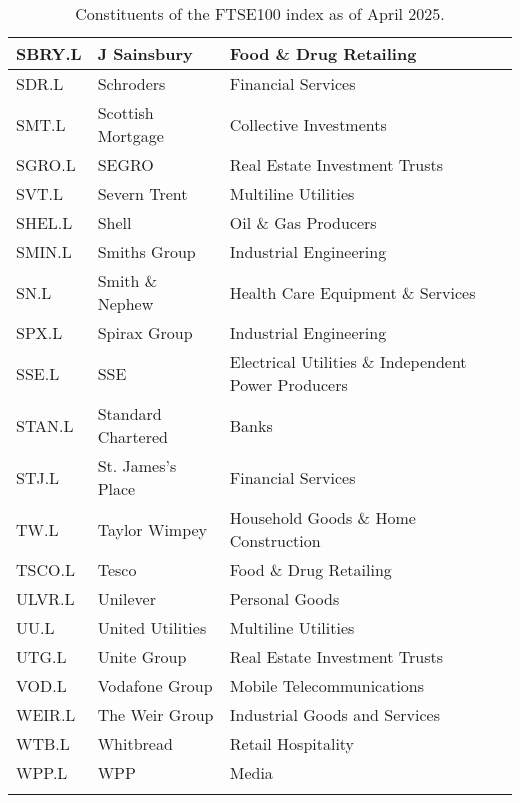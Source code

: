 \begin{longtable}{|p{2cm}|p{4cm}|p{6cm}|}
SBRY.L & J Sainsbury & Food \& Drug Retailing \\ \hline
SDR.L & Schroders & Financial Services \\ \hline
SMT.L & Scottish Mortgage & Collective Investments \\ \hline
SGRO.L & SEGRO & Real Estate Investment Trusts \\ \hline
SVT.L & Severn Trent & Multiline Utilities \\ \hline
SHEL.L & Shell & Oil \& Gas Producers \\ \hline
SMIN.L & Smiths Group & Industrial Engineering \\ \hline
SN.L & Smith \& Nephew & Health Care Equipment \& Services \\ \hline
SPX.L & Spirax Group & Industrial Engineering \\ \hline
SSE.L & SSE & Electrical Utilities \& Independent Power Producers \\ \hline
STAN.L & Standard Chartered & Banks \\ \hline
STJ.L & St. James's Place & Financial Services \\ \hline
TW.L & Taylor Wimpey & Household Goods \& Home Construction \\ \hline
TSCO.L & Tesco & Food \& Drug Retailing \\ \hline
ULVR.L & Unilever & Personal Goods \\ \hline
UU.L & United Utilities &  Multiline Utilities \\ \hline
UTG.L & Unite Group & Real Estate Investment Trusts \\ \hline
VOD.L & Vodafone Group & Mobile Telecommunications \\ \hline
WEIR.L & The Weir Group & Industrial Goods and Services \\ \hline
WTB.L & Whitbread & Retail Hospitality \\ \hline
WPP.L & WPP & Media \\ \hline
\caption{Constituents of the FTSE100 index as of April 2025. \cite{WikipediaFtse100}}
\label{tab:ftse100constituents}
\end{longtable}
